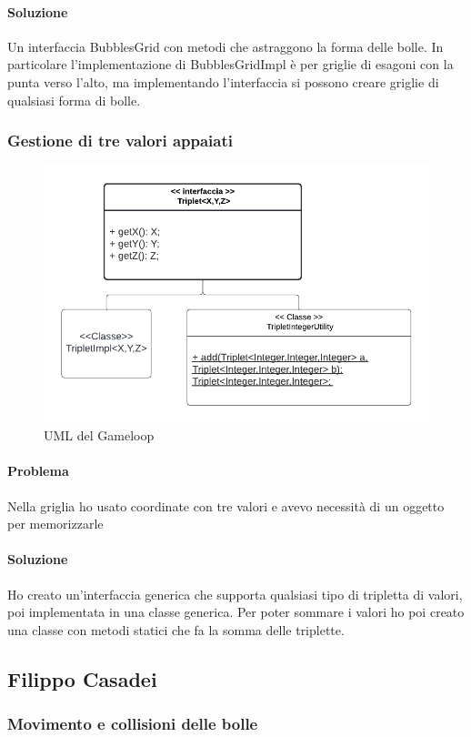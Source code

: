\documentclass[a4paper,12pt]{report}
\begin{document}
\paragraph{Soluzione} Un interfaccia BubblesGrid con metodi che astraggono la forma delle bolle. 
In particolare l'implementazione di BubblesGridImpl è per griglie di esagoni con la punta verso l'alto, 
ma implementando l'interfaccia si possono creare griglie di qualsiasi forma di bolle.

\subsubsection{Gestione di tre valori appaiati}

\begin{figure}[H]
	\centering{}
	\includegraphics[width=.7\textwidth]{img/triplet.pdf}
	\caption{UML del Gameloop}
\end{figure}

\paragraph{Problema} Nella griglia ho usato coordinate con tre valori e avevo necessità di un oggetto per memorizzarle

\paragraph{Soluzione} Ho creato un'interfaccia generica che supporta qualsiasi tipo di tripletta di valori, poi implementata in una classe generica.
Per poter sommare i valori ho poi creato una classe con metodi statici che fa la somma delle triplette.

\subsection{Filippo Casadei}
\subsubsection{Movimento e collisioni delle bolle}
\end{document}
